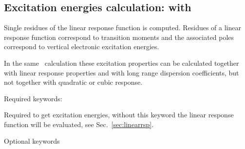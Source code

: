 \subsection{Excitation energies calculation:  with }

Single residues of the linear
response function is
computed. Residues of a linear response function correspond to
transition moments and the associated poles
correspond to vertical electronic excitation energies.

In the same \resp\ calculation these excitation properties can be calculated
together with linear response properties
and with long range dispersion coefficients, but not
together with quadratic or cubic response.

Required keywords:

\begin{description}

\item{} Required to get excitation energies, without
this keyword the linear response function will be evaluated, see Sec.~\ref{sec:linearrsp}.

\end{description}

Optional keywords

